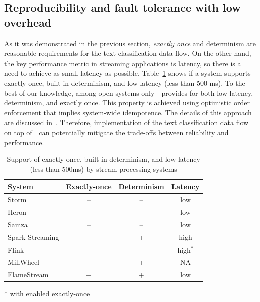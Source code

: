 \label {fs-solution}

\subsection{Reproducibility and fault tolerance with low overhead}

As it was demonstrated in the previous section, {\em exactly once} and determinism are reasonable requirements for the text classification data flow. On the other hand, the key performance metric in streaming applications is latency, so there is a need to achieve as small latency as possible. Table~\ref{comparison} shows if a system supports exactly once, built-in determinism, and low latency (less than 500 ms). To the best of our knowledge, among open systems only~\FlameStream\ provides for both low latency, determinism, and exactly once. This property is achieved using optimistic order enforcement that implies system-wide idempotence. The details of this approach are discussed in~\cite{we2018adbis, we2018beyondmr, we2018seim}. Therefore, implementation of the text classification data flow on top of~\FlameStream\ can potentially mitigate the trade-offs between reliability and performance.

\begin{table}[htbp]
\caption{Support of exactly once, built-in determinism, and low latency (less than 500ms) by stream processing systems}
\begin{threeparttable}
\begin{tabular}{lccc}
System & Exactly-once & Determinism & Latency    \\
\hline
Storm  &    --      &   --       &   low            \\
Heron  &    --      &   --       &   low            \\
Samza  &    --      &   --       &   low            \\
Spark Streaming    &    +       &   +        &   high           \\
Flink              &    +       &   -        &   high$^*$       \\
MillWheel          &    +       &   +        &   NA             \\
FlameStream        &    +       &   +        &   low            \\
\end{tabular}
* with enabled exactly-once~\cite{we2018beyondmr}
\end{threeparttable}
\label{comparison}
\end{table}


